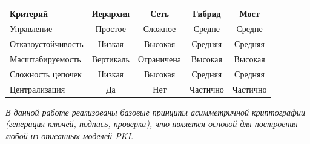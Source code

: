 \begin{center}
\begin{tabular}{|l|c|c|c|c|}
\hline
\textbf{Критерий} & \textbf{Иерархия} & \textbf{Сеть} & \textbf{Гибрид} & \textbf{Мост} \\
\hline
Управление & Простое & Сложное & Средне & Средне \\
\hline
Отказоустойчивость & Низкая & Высокая & Средняя & Средняя \\
\hline
Масштабируемость & Вертикаль & Ограничена & Высокая & Высокая \\
\hline
Сложность цепочек & Низкая & Высокая & Средняя & Средняя \\
\hline
Централизация & Да & Нет & Частично & Частично \\
\hline
\end{tabular}
\end{center}

\textit{В данной работе реализованы базовые принципы асимметричной криптографии (генерация ключей, подпись, проверка), что является основой для построения любой из описанных моделей PKI.}

